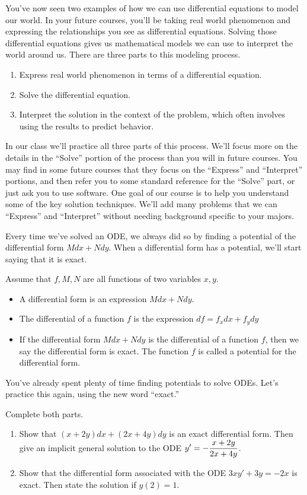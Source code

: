 You've now seen two examples of how we can use differential equations to model our world. 
In your future courses, you'll be taking real world phenomenon and expressing the relationships you see as differential equations. 
Solving those differential equations gives us mathematical models we can use to interpret the world around us. 
There are three parts to this modeling process. 
\begin{enumerate}
 \item Express real world phenomenon in terms of a differential equation.
 \item Solve the differential equation.
 \item Interpret the solution in the context of the problem, which often involves using the results to predict behavior.
\end{enumerate}
In our class we'll practice all three parts of this process. We'll focus more on the details in the ``Solve'' portion of the process than you will in future courses. You may find in some future courses that they focus on the ``Express'' and ``Interpret'' portions, and then refer you to some standard reference for the ``Solve'' part, or just ask you to use software. One goal of our course is to help you understand some of the key solution techniques. We'll add many problems that we can ``Express'' and ``Interpret'' without needing  background specific to your majors.

Every time we've solved an ODE, we always did so by finding a potential of the differential form $Mdx+Ndy$. When a differential form has a potential, we'll start saying that it is exact.   
\begin{definition}
Assume that $f,M,N$ are all functions of two variables $x,y$.
\begin{itemize}
\item A differential form is an expression $Mdx+Ndy$.
\item The differential of a function {$f$} is the expression {$df = f_xdx+f_ydy$}
\item If the differential form $Mdx+Ndy$ is the differential of a function {$f$}, then we say the differential form is exact. The function {$f$} is called a potential for the differential form.
\end{itemize} 
\end{definition}

You've already spent plenty of time finding potentials to solve ODEs.  Let's practice this again, using the new word ``exact.''
\begin{problem}
%
Complete both parts. 
\begin{enumerate}
 \item Show that $(x+2y)dx+(2x+4y)dy$ is an exact differential form. Then give an implicit general solution to the ODE $\displaystyle y'=-\frac{x+2y}{2x+4y}$. 
 \item Show that the differential form associated with the ODE $3xy'+3y=-2x$ is exact.  Then state the solution if $y(2)=1$. 
\end{enumerate}

\end{problem}

